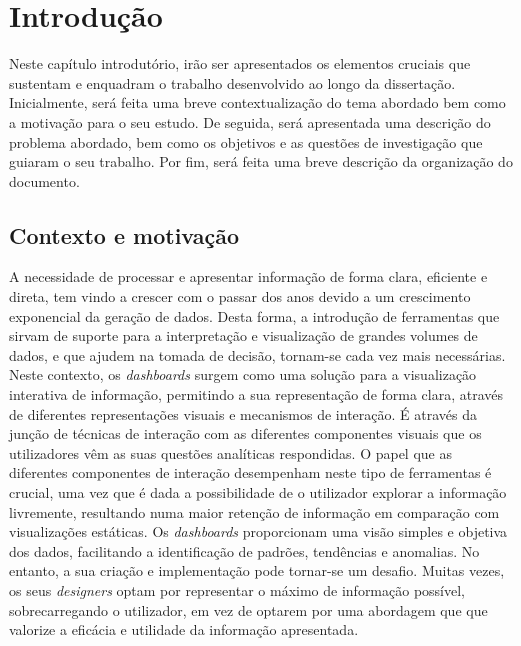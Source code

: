 
%

\chapter{Introdução}
\label{cha:introducao}

Neste capítulo introdutório, irão ser apresentados os elementos cruciais que sustentam e enquadram o trabalho desenvolvido ao longo da dissertação. Inicialmente, será feita uma breve contextualização do tema abordado bem como a motivação para o seu estudo. De seguida, será apresentada uma descrição do problema abordado, bem como os objetivos e as questões de investigação que guiaram o seu trabalho. Por fim, será feita uma breve descrição da organização do documento.

\section{Contexto e motivação}
\label{sec:cont_e_motiv}

A necessidade de processar e apresentar informação de forma clara, eficiente e direta, tem vindo a crescer com o passar dos anos devido a um crescimento exponencial da geração de dados. Desta forma, a introdução de ferramentas que sirvam de suporte para a interpretação e visualização de grandes volumes de dados, e que ajudem na tomada de decisão, tornam-se cada vez mais necessárias. Neste contexto, os \textit{dashboards} surgem como uma solução para a visualização interativa de informação, permitindo a sua representação de forma clara, através de diferentes representações visuais e mecanismos de interação. É através da junção de técnicas de interação com as diferentes componentes visuais que os utilizadores vêm as suas questões analíticas respondidas. O papel que as diferentes componentes de interação desempenham neste tipo de ferramentas é crucial, uma vez que é dada a possibilidade de o utilizador explorar a informação livremente, resultando numa maior retenção de informação em comparação com visualizações estáticas. Os \textit{dashboards} proporcionam uma visão simples e objetiva dos dados, facilitando a identificação de padrões, tendências e anomalias. No entanto, a sua criação e implementação pode tornar-se um desafio. Muitas vezes, os seus \textit{designers} optam por representar o máximo de informação possível, sobrecarregando o utilizador, em vez de optarem por uma abordagem que que valorize a eficácia e utilidade da informação apresentada.


